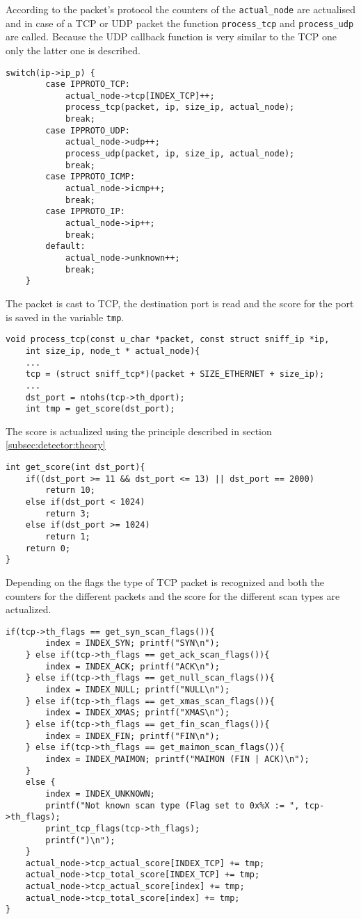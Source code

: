 According to the packet's protocol the counters of the \lstinline|actual_node|
are actualised and in case of a TCP or UDP packet the function \lstinline|process_tcp| and 
\lstinline|process_udp| are called. Because the UDP callback function is very similar to the 
TCP one only the latter one is described.
\begin{lstlisting}[style=MyC, caption=The \lstinline|got_packet| function.]
	switch(ip->ip_p) {
		case IPPROTO_TCP:
			actual_node->tcp[INDEX_TCP]++;
			process_tcp(packet, ip, size_ip, actual_node);
			break;
		case IPPROTO_UDP:
			actual_node->udp++;
			process_udp(packet, ip, size_ip, actual_node);
			break;
		case IPPROTO_ICMP:
			actual_node->icmp++;
			break;
		case IPPROTO_IP:
			actual_node->ip++;
			break;
		default:
			actual_node->unknown++;
			break;
	} 
\end{lstlisting}
The packet is cast to TCP, the destination port is read and 
the score for the port is saved in the variable \lstinline|tmp|. 
\begin{lstlisting}[style=MyC]
void process_tcp(const u_char *packet, const struct sniff_ip *ip,
	int size_ip, node_t * actual_node){
	...
	tcp = (struct sniff_tcp*)(packet + SIZE_ETHERNET + size_ip);
	...
	dst_port = ntohs(tcp->th_dport);
	int tmp = get_score(dst_port);
\end{lstlisting}
The score is actualized using the principle described in
section \ref{subsec:detector:theory}
\begin{lstlisting}[style=MyC]
int get_score(int dst_port){
	if((dst_port >= 11 && dst_port <= 13) || dst_port == 2000)
		return 10;
	else if(dst_port < 1024)
		return 3;
	else if(dst_port >= 1024)
		return 1;
	return 0;
}
\end{lstlisting}



Depending on the flags
the type of TCP packet is recognized and both the counters for the different
packets and the score for the different scan types are actualized.
\begin{lstlisting}[style=MyC]
	if(tcp->th_flags == get_syn_scan_flags()){
		index = INDEX_SYN; printf("SYN\n");
	} else if(tcp->th_flags == get_ack_scan_flags()){
		index = INDEX_ACK; printf("ACK\n");
	} else if(tcp->th_flags == get_null_scan_flags()){
		index = INDEX_NULL; printf("NULL\n");
	} else if(tcp->th_flags == get_xmas_scan_flags()){
		index = INDEX_XMAS; printf("XMAS\n");
	} else if(tcp->th_flags == get_fin_scan_flags()){
		index = INDEX_FIN; printf("FIN\n");
	} else if(tcp->th_flags == get_maimon_scan_flags()){
		index = INDEX_MAIMON; printf("MAIMON (FIN | ACK)\n");
	}
	else {
		index = INDEX_UNKNOWN;
		printf("Not known scan type (Flag set to 0x%X := ", tcp->th_flags);
		print_tcp_flags(tcp->th_flags);
		printf(")\n");
	}
	actual_node->tcp_actual_score[INDEX_TCP] += tmp;
	actual_node->tcp_total_score[INDEX_TCP] += tmp;
	actual_node->tcp_actual_score[index] += tmp;
	actual_node->tcp_total_score[index] += tmp;
}
\end{lstlisting}

